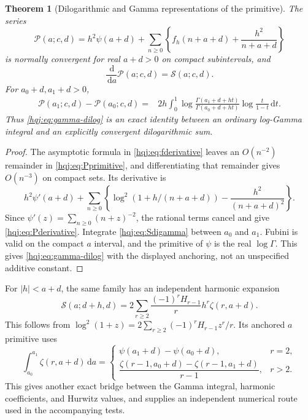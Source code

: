 \documentclass[11pt,letterpaper]{article}
\numberwithin{equation}{section}
\newtheorem{theorem}{Theorem}[section]
\theoremstyle{definition}
\newcommand{\dd}{\,\mathrm{d}}
\begin{document}
\begin{theorem}[Dilogarithmic and Gamma representations of the primitive]
\label{hqj:thm:primitive}
The series
\begin{equation}\label{hqj:eq:Pprimitive}
\mathscr P(a;c,d)=h^2\psi(a+d)+
\sum_{n\ge0}\left\{f_h(n+a+d)+\frac{h^2}{n+a+d}\right\}
\end{equation}
is normally convergent for real $a+d>0$ on compact subintervals, and
\begin{equation}\label{hqj:eq:Pderivative}
\frac{\dd}{\dd a}\mathscr P(a;c,d)=\mathscr S(a;c,d).
\end{equation}
For $a_0+d,a_1+d>0$,
\begin{align}
\mathscr P(a_1;c,d)-\mathscr P(a_0;c,d)
={}&2h\int_0^1
\log\frac{\Gamma(a_1+d+ht)}{\Gamma(a_0+d+ht)}
\log\frac{t}{1-t}\dd t.
\label{hqj:eq:gamma-dilog}
\end{align}
Thus \eqref{hqj:eq:gamma-dilog} is an exact identity between an ordinary
log-Gamma integral and an explicitly convergent dilogarithmic sum.
\end{theorem}
\begin{proof}
The asymptotic formula in \eqref{hqj:eq:fderivative} leaves an
$O(n^{-2})$ remainder in \eqref{hqj:eq:Pprimitive}, and differentiating
that remainder gives $O(n^{-3})$ on compact sets. Its derivative is
\[
h^2\psi'(a+d)+\sum_{n\ge0}
\left\{\log^2(1+h/(n+a+d))-\frac{h^2}{(n+a+d)^2}\right\}.
\]
Since $\psi'(z)=\sum_{n\ge0}(n+z)^{-2}$, the rational terms cancel
and give \eqref{hqj:eq:Pderivative}. Integrate
\eqref{hqj:eq:Sdigamma} between $a_0$ and $a_1$. Fubini is valid on the
compact $a$ interval, and the primitive of $\psi$ is the real
$\log\Gamma$. This gives \eqref{hqj:eq:gamma-dilog} with the displayed
anchoring, not an unspecified additive constant.
\end{proof}

For $|h|<a+d$, the same family has an independent harmonic expansion
\begin{equation}\label{hqj:eq:S-harmonic}
\mathscr S(a;d+h,d)=
2\sum_{r\ge2}\frac{(-1)^rH_{r-1}}r h^r\zeta(r,a+d).
\end{equation}
This follows from
$\log^2(1+z)=2\sum_{r\ge2}(-1)^rH_{r-1}z^r/r$.
Its anchored $a$ primitive uses
\[
\int_{a_0}^{a_1}\zeta(r,a+d)\dd a
=\begin{cases}
\psi(a_1+d)-\psi(a_0+d),&r=2,\\
\dfrac{\zeta(r-1,a_0+d)-\zeta(r-1,a_1+d)}{r-1},&r>2.
\end{cases}
\]
This gives another exact bridge between the Gamma integral,
harmonic coefficients, and Hurwitz values, and supplies an independent
numerical route used in the accompanying tests.
\end{document}
